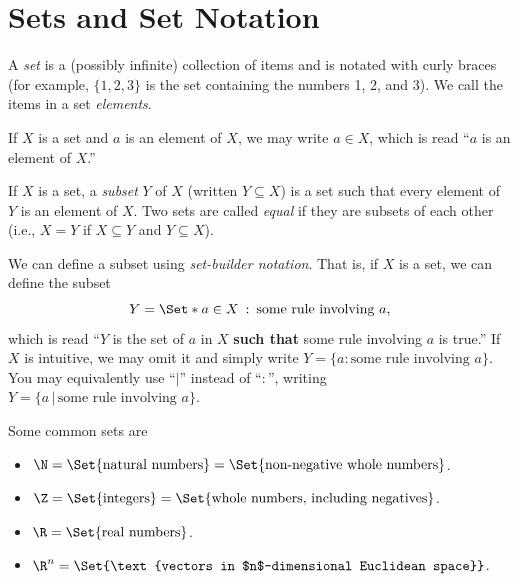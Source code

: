 \documentclass{problemset}
\providecommand\given{}
\newcommand\SetSymbol[1][]{%
	\nonscript\::%
	\allowbreak
	\nonscript\:
	\mathopen{}}
\renewcommand\given{\SetSymbol[\delimsize]}
\begin{document}
\section*{Sets and Set Notation}
\vspace{-.5cm}

	\begin{definition}[Set]
		A \emph{set} is a (possibly infinite) collection of items
		and is notated with curly braces (for example, $\{1,2,3\}$ is
		the set containing the numbers 1, 2, and 3).  We call the items in
		a set \emph{elements}.

		If $X$ is a set and $a$ is an element of $X$, we may write $a\in X$,
		which is read ``$a$ is an element of $X$.''

		If $X$ is a set, a \emph{subset} $Y$ of $X$ (written $Y\subseteq X$)
		is a set such that every element of $Y$ is an element of $X$. Two sets are
		called \emph{equal} if they are subsets of each other (i.e., $X=Y$ if
		$X\subseteq Y$ and $Y\subseteq X$).

		We can define a subset using \emph{set-builder notation}.
		That is, if $X$ is a set, we can define the subset
		\[
			Y= \Set*{a\in X \given \text{some rule involving }a},
		\]
		which is read ``$Y$ is the set of $a$ in $X$ {\bf such that} some rule
		involving $a$ is true.''  If $X$ is intuitive, we may omit it and
		simply write $Y=\{a:\text{some rule involving }a\}$.  You may equivalently
		use ``$|$'' instead of ``$:$'', writing $Y=\{a\,|\,\text{some rule involving }a\}$.
	\end{definition}

	\begin{definition}
		Some common sets are
		\begin{itemize}
			\item[] $\N=\Set{\text{natural numbers}} = \Set{\text{non-negative whole numbers}}$.
			\item[] $\Z=\Set{\text{integers}} = \Set{\text{whole numbers, including negatives}}$.
			\item[] $\R=\Set{\text{real numbers}}$.
			\item[] $\R^n=\Set{\text{vectors in $n$-dimensional Euclidean space}}$.
		\end{itemize}
	\end{definition}
\end{document}
